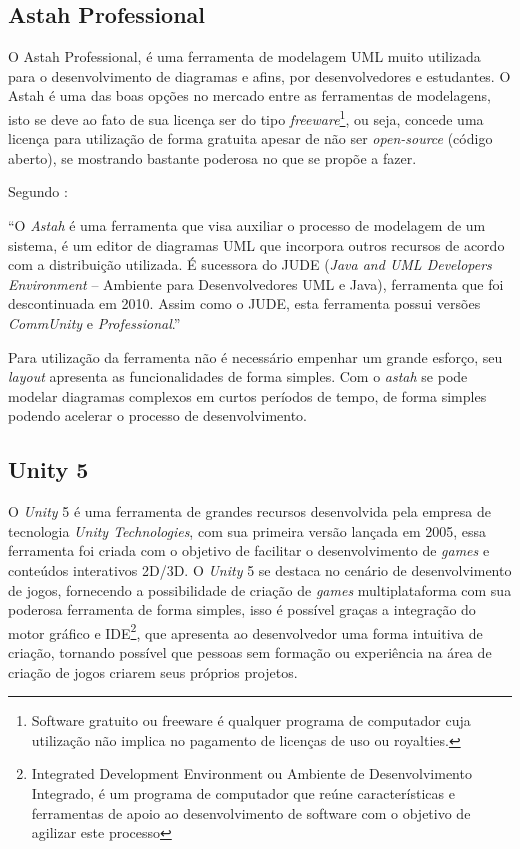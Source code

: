 \documentclass[
	12pt,				%
    oneside,			%
	a4paper,			%
	english,			%
	french,				%
	spanish,			%
	brazil,				%
	]{abntex2}
\begin{document}
		\subsection{Astah Professional}
			
			O Astah Professional, é uma ferramenta de modelagem UML muito utilizada para o desenvolvimento de diagramas e afins, por desenvolvedores e estudantes. O Astah é uma das boas opções no mercado entre as ferramentas de modelagens, isto se deve ao fato de sua licença ser do tipo \textit{freeware}\footnote{Software gratuito ou freeware é qualquer programa de computador cuja utilização não implica no pagamento de licenças de uso ou royalties.}, ou seja, concede uma licença para utilização de forma gratuita apesar de não ser \textit{open-source} (código aberto), se mostrando bastante poderosa no que se propõe a fazer.
			
			Segundo :     	
				\begin{citacao}
				“O \textit{Astah} é uma ferramenta que visa auxiliar o processo de modelagem de um sistema, é um editor de diagramas UML que incorpora outros recursos de acordo com a distribuição utilizada. É sucessora do JUDE (\textit{Java and UML Developers Environment} – Ambiente para Desenvolvedores UML e Java), ferramenta que foi descontinuada em 2010. Assim como o JUDE, esta ferramenta possui versões \textit{CommUnity} e \textit{Professional}.”
				\end{citacao}
			
			Para utilização da ferramenta não é necessário empenhar um grande esforço, seu \textit{layout} apresenta as funcionalidades de forma simples. Com o \textit{astah} se pode modelar diagramas complexos em curtos períodos de tempo, de forma simples podendo acelerar o processo de desenvolvimento. 
		
		\subsection{Unity 5}
			
			O \textit{Unity} 5 é uma ferramenta de grandes recursos desenvolvida pela empresa de tecnologia \textit{Unity Technologies}, com sua primeira versão lançada em 2005, essa ferramenta foi criada com o objetivo de facilitar o desenvolvimento de \textit{games} e conteúdos interativos 2D/3D. O \textit{Unity} 5 se destaca no cenário de desenvolvimento de jogos, fornecendo a possibilidade de criação de \textit{games} multiplataforma com sua poderosa ferramenta de forma simples, isso é possível graças a integração do motor gráfico e IDE\footnote{ Integrated Development Environment ou Ambiente de Desenvolvimento Integrado, é um programa de computador que reúne características e ferramentas de apoio ao desenvolvimento de software com o objetivo de agilizar este processo}, que apresenta ao desenvolvedor uma forma intuitiva de criação, tornando possível que pessoas sem formação ou experiência na área de criação de jogos criarem seus próprios projetos.
			
\end{document}
